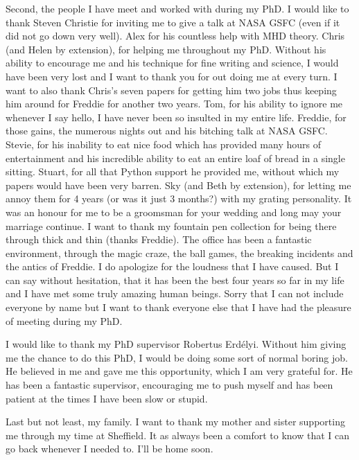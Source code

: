 \begin{acknowledgements}
    Second, the people I have meet and worked with during my PhD.
    I would like to thank Steven Christie for inviting me to give a talk at NASA GSFC (even if it did not go down very well).
    Alex for his countless help with MHD theory.
    Chris (and Helen by extension), for helping me throughout my PhD.
    Without his ability to encourage me and his technique for fine writing and science, I would have been very lost and I want to thank you for out doing me at every turn.
    I want to also thank Chris's seven papers for getting him two jobs thus keeping him around for Freddie for another two years.
    Tom, for his ability to ignore me whenever I say hello, I have never been so insulted in my entire life.
    Freddie, for those gains, the numerous nights out and his bitching talk at NASA GSFC.
    Stevie, for his inability to eat nice food which has provided many hours of entertainment and his incredible ability to eat an entire loaf of bread in a single sitting. 
    Stuart, for all that Python support he provided me, without which my papers would have been very barren.
    Sky (and Beth by extension), for letting me annoy them for 4 years (or was it just 3 months?) with my grating personality.
    It was an honour for me to be a groomsman for your wedding and long may your marriage continue.
    I want to thank my fountain pen collection for being there through thick and thin (thanks Freddie).
    The office has been a fantastic environment, through the magic craze, the ball games, the breaking incidents and the antics of Freddie. 
    I do apologize for the loudness that I have caused.
    But I can say without hesitation, that it has been the best four years so far in my life and I have met some truly amazing human beings.
    Sorry that I can not include everyone by name but I want to thank everyone else that I have had the pleasure of meeting during my PhD.
        
    I would like to thank my PhD supervisor Robertus Erd\'elyi.
    Without him giving me the chance to do this PhD, I would be doing some sort of normal boring job.
    He believed in me and gave me this opportunity, which I am very grateful for.
    He has been a fantastic supervisor, encouraging me to push myself and has been patient at the times I have been slow or stupid.
    
    Last but not least, my family.
    I want to thank my mother and sister supporting me through my time at Sheffield.
    It as always been a comfort to know that I can go back whenever I needed to.
    I'll be home soon.
    
\end{acknowledgements}